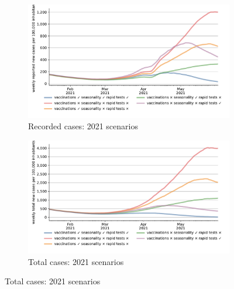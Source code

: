 \begin{figure}[!tp]
    \centering

    \begin{subfigure}[b]{0.475\textwidth}
        \centering
        \includegraphics[width=\textwidth]{../figures/results/figures/scenario_comparisons/effect_of_channels_on_pessimistic_scenario/full_new_known_case}
        \caption{{\small Recorded cases: 2021 scenarios}}
        \label{fig:2021_scenarios_recorded}
    \end{subfigure}
    \hfill
    \begin{subfigure}[b]{0.475\textwidth}
        \centering
        \includegraphics[width=\textwidth]{../figures/results/figures/scenario_comparisons/effect_of_channels_on_pessimistic_scenario/full_newly_infected}
        \caption{{\small Total cases: 2021 scenarios}}
        \label{fig:2021_scenarios_newly_infected}
    \end{subfigure}


\end{figure}
